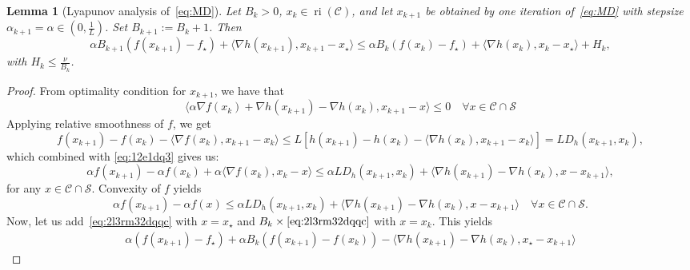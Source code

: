 \documentclass[a4paper]{article}
\renewcommand{\leq}{\leqslant}
\newcommand{\CC}{\mathcal{C}}
\renewcommand{\SS}{\mathcal{S}}
\newcommand{\coloneqq}{:=}
\newcommand{\ip}[2]{\langle #1, #2\rangle}
\DeclareMathOperator{\ri}{ri}
\newtheorem{lemma}{Lemma}
\begin{document}
\begin{lemma}[Lyapunov analysis of~\eqref{eq:MD}]\label{lem:lyapunov_MD}
        Let $B_k> 0$, $x_k\in \ri(\CC)$, and let $x_{k+1}$ be obtained by one iteration of~\eqref{eq:MD} with stepsize $\alpha_{k+1}=\alpha\in \left(0,\tfrac1L\right)$.
        Set $B_{k+1}\coloneqq B_k+1$.
        Then
        \begin{equation}\label{eq:lyap_analysis_MD}   
            \alpha B_{k+1}(f(x_{k+1})-f_\star)+\ip{\nabla h(x_{k+1})}{ x_{k+1}-x_\star}
            \leq
            \alpha B_k (f(x_k)-f_\star)+\ip{\nabla h(x_k)}{ x_k-x_\star}+H_k,
        \end{equation}
        with $H_k\leq \tfrac{\nu}{B_k}$.
\end{lemma}
\begin{proof}
        From optimality condition for $x_{k+1}$, we have that
        \begin{equation}\label{eq:12e1dq3}
                \ip{\alpha \nabla f(x_{k}) + \nabla h(x_{k+1}) - \nabla h(x_k)}{ x_{k+1}-x}
                \leq
                0
                \quad \forall x\in \CC\cap\SS
        \end{equation}
        Applying relative smoothness of $f$, we get
        \[
                f(x_{k+1}) - f(x_k) - \ip{ \nabla f(x_k)}{ x_{k+1} - x_k}
                \leq
                L \left[ h(x_{k+1}) - h(x_k) - \ip{\nabla h(x_k)}{ x_{k+1}- x_k} \right]
                =
                L D_h(x_{k+1},x_k),
        \]
        which combined with \eqref{eq:12e1dq3} gives us:
        \begin{equation}\label{eq:2l3rm}
                \alpha f(x_{k+1}) - \alpha f(x_k) + \alpha\ip{ \nabla f(x_{k})}{ x_{k}-x}
                \leq
                \alpha L D_h(x_{k+1}, x_k) + \ip{ \nabla h(x_{k+1}) - \nabla h(x_k)}{ x - x_{k+1}},
        \end{equation}  
        for any $x\in  \CC\cap\SS$. Convexity of $f$ yields
        \begin{equation}\label{eq:2l3rm32dqqc}
                \alpha f(x_{k+1}) -  \alpha f(x)
                \leq
                \alpha L D_h(x_{k+1}, x_k) + \ip{ \nabla h(x_{k+1}) - \nabla h(x_k)}{ x - x_{k+1}}
                \quad \forall x\in  \CC\cap\SS.
        \end{equation}  
        Now, let us add~\eqref{eq:2l3rm32dqqc} with $x = x_\star$ and $B_k\times\eqref{eq:2l3rm32dqqc}$ with $x = x_k$.
        This yields
        \begin{multline}\label{eq:dscjom}
                \alpha\left(f(x_{k+1})-f_\star\right) +  \alpha B_k\left(f(x_{k+1})-f(x_k)\right)  - \ip{\nabla h(x_{k+1}) - \nabla h(x_k)}{ x_\star - x_{k+1}}

\end{multline}
\end{proof}
\end{document}
